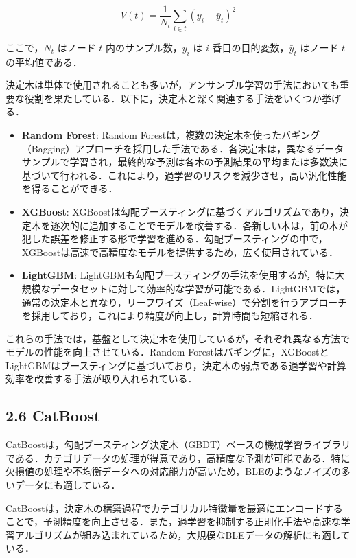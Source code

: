 \begin{equation}
	V(t) = \frac{1}{N_t} \sum_{i \in t} (y_i - \bar{y}_t)^2
\end{equation}

ここで，$N_t$ はノード $t$ 内のサンプル数，$y_i$ は $i$ 番目の目的変数，$\bar{y}_t$ はノード $t$ の平均値である．


決定木は単体で使用されることも多いが，アンサンブル学習の手法においても重要な役割を果たしている．以下に，決定木と深く関連する手法をいくつか挙げる．

\begin{itemize}
	\item \textbf{Random Forest}: 
	Random Forestは，複数の決定木を使ったバギング（Bagging）アプローチを採用した手法である．各決定木は，異なるデータサンプルで学習され，最終的な予測は各木の予測結果の平均または多数決に基づいて行われる．これにより，過学習のリスクを減少させ，高い汎化性能を得ることができる．
	
	\item \textbf{XGBoost}:
	XGBoostは勾配ブースティングに基づくアルゴリズムであり，決定木を逐次的に追加することでモデルを改善する．各新しい木は，前の木が犯した誤差を修正する形で学習を進める．勾配ブースティングの中で，XGBoostは高速で高精度なモデルを提供するため，広く使用されている．
	
	\item \textbf{LightGBM}:
	LightGBMも勾配ブースティングの手法を使用するが，特に大規模なデータセットに対して効率的な学習が可能である．LightGBMでは，通常の決定木と異なり，リーフワイズ（Leaf-wise）で分割を行うアプローチを採用しており，これにより精度が向上し，計算時間も短縮される．
\end{itemize}

これらの手法では，基盤として決定木を使用しているが，それぞれ異なる方法でモデルの性能を向上させている．Random Forestはバギングに，XGBoostとLightGBMはブースティングに基づいており，決定木の弱点である過学習や計算効率を改善する手法が取り入れられている．

\subsection*{2.6 CatBoost}
CatBoostは，勾配ブースティング決定木（GBDT）ベースの機械学習ライブラリである．カテゴリデータの処理が得意であり，高精度な予測が可能である．特に欠損値の処理や不均衡データへの対応能力が高いため，BLEのようなノイズの多いデータにも適している．

CatBoostは，決定木の構築過程でカテゴリカル特徴量を最適にエンコードすることで，予測精度を向上させる．また，過学習を抑制する正則化手法や高速な学習アルゴリズムが組み込まれているため，大規模なBLEデータの解析にも適している．

